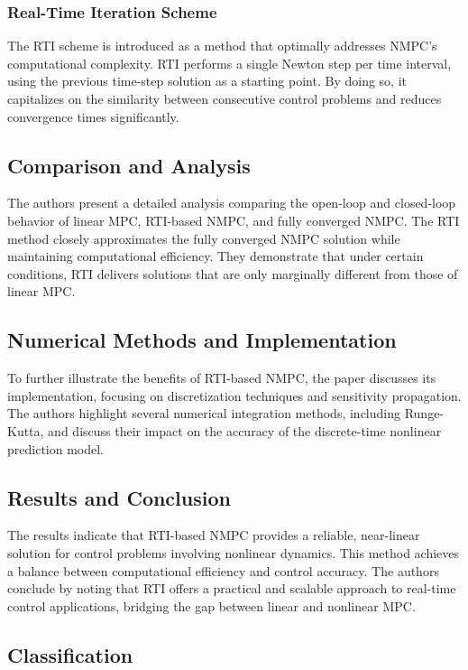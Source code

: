 \documentclass[a4paper,12pt]{article}
\begin{document}
    \subsubsection{Real-Time Iteration Scheme}
    The RTI scheme is introduced as a method that optimally addresses NMPC’s computational complexity. RTI performs a single Newton step per time interval, using the previous time-step solution as a starting point. By doing so, it capitalizes on the similarity between consecutive control problems and reduces convergence times significantly.
    
    \subsection{Comparison and Analysis}
    The authors present a detailed analysis comparing the open-loop and closed-loop behavior of linear MPC, RTI-based NMPC, and fully converged NMPC. The RTI method closely approximates the fully converged NMPC solution while maintaining computational efficiency. They demonstrate that under certain conditions, RTI delivers solutions that are only marginally different from those of linear MPC.
    
    \subsection{Numerical Methods and Implementation}
    To further illustrate the benefits of RTI-based NMPC, the paper discusses its implementation, focusing on discretization techniques and sensitivity propagation. The authors highlight several numerical integration methods, including Runge-Kutta, and discuss their impact on the accuracy of the discrete-time nonlinear prediction model.
    
    \subsection{Results and Conclusion}
    The results indicate that RTI-based NMPC provides a reliable, near-linear solution for control problems involving nonlinear dynamics. This method achieves a balance between computational efficiency and control accuracy. The authors conclude by noting that RTI offers a practical and scalable approach to real-time control applications, bridging the gap between linear and nonlinear MPC.

    \subsection {Classification}
    
\end{document}
